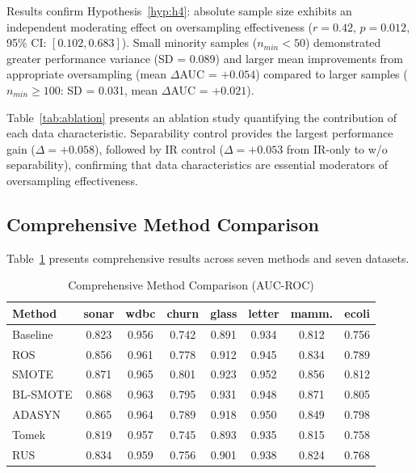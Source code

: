 \documentclass{ijSmartGrid}
\theoremstyle{definition}
\begin{document}
\indent Results confirm Hypothesis~\ref{hyp:h4}: absolute sample size exhibits an independent moderating effect on oversampling effectiveness ($r = 0.42$, $p = 0.012$, 95\% CI: $[0.102, 0.683]$). Small minority samples ($n_{min} < 50$) demonstrated greater performance variance (SD = 0.089) and larger mean improvements from appropriate oversampling (mean $\Delta$AUC = $+0.054$) compared to larger samples ($n_{min} \geq 100$: SD = 0.031, mean $\Delta$AUC = $+0.021$).

\indent Table~\ref{tab:ablation} presents an ablation study quantifying the contribution of each data characteristic. Separability control provides the largest performance gain ($\Delta = +0.058$), followed by IR control ($\Delta = +0.053$ from IR-only to w/o separability), confirming that data characteristics are essential moderators of oversampling effectiveness.

\subsection{Comprehensive Method Comparison}
\indent Table~\ref{tab:method_comparison} presents comprehensive results across seven methods and seven datasets.

\begin{table}[!ht]
  \centering
  \caption{Comprehensive Method Comparison (AUC-ROC)}
  \label{tab:method_comparison}
  \small
  \begin{tabular}{lccccccc}
    \toprule
    Method & sonar & wdbc & churn & glass & letter & mamm. & ecoli \\
    \midrule
    Baseline & 0.823 & 0.956 & 0.742 & 0.891 & 0.934 & 0.812 & 0.756 \\
    ROS & 0.856 & 0.961 & 0.778 & 0.912 & 0.945 & 0.834 & 0.789 \\
    SMOTE & 0.871 & 0.965 & 0.801 & 0.923 & 0.952 & 0.856 & 0.812 \\
    BL-SMOTE & 0.868 & 0.963 & 0.795 & 0.931 & 0.948 & 0.871 & 0.805 \\
    ADASYN & 0.865 & 0.964 & 0.789 & 0.918 & 0.950 & 0.849 & 0.798 \\
    Tomek & 0.819 & 0.957 & 0.745 & 0.893 & 0.935 & 0.815 & 0.758 \\
    RUS & 0.834 & 0.959 & 0.756 & 0.901 & 0.938 & 0.824 & 0.768 \\
    \bottomrule
  \end{tabular}
\end{table}
\end{document}
